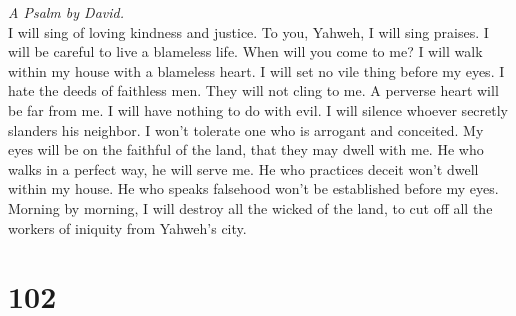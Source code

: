 \emph{A Psalm by David.}\\
 I will sing of loving kindness and justice. To you,
Yahweh, I will sing praises.  I will be careful to live a
blameless life. When will you come to me? I will walk within my house
with a blameless heart.  I will set no vile thing before
my eyes. I hate the deeds of faithless men. They will not cling to me.
 A perverse heart will be far from me. I will have nothing
to do with evil.  I will silence whoever secretly slanders
his neighbor. I won't tolerate one who is arrogant and conceited.
 My eyes will be on the faithful of the land, that they
may dwell with me. He who walks in a perfect way, he will serve me.
 He who practices deceit won't dwell within my house. He
who speaks falsehood won't be established before my eyes. 
Morning by morning, I will destroy all the wicked of the land, to cut
off all the workers of iniquity from Yahweh's city.

\hypertarget{section-101}{%
\section{102}\label{section-101}}

